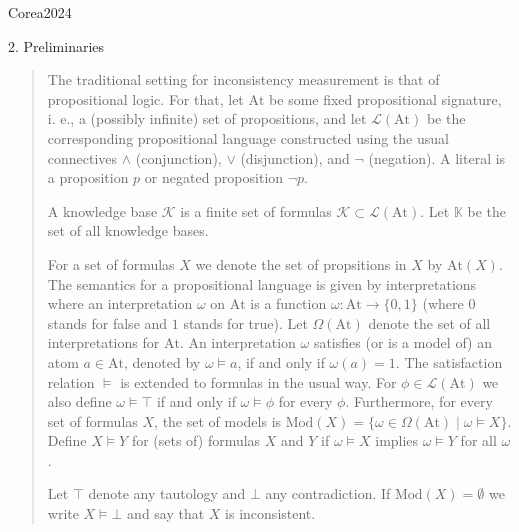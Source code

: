 Corea2024

2. Preliminaries

\begin{quotation}
    The traditional setting for inconsistency measurement is that of propositional logic. For that, let $\text{At}$ be some fixed propositional signature, i. e., a (possibly infinite) set of propositions, and let $\mathcal{L}(\text{At})$ be the corresponding propositional language constructed using the usual connectives $\land$ (conjunction), $\lor$ (disjunction), and $\neg$ (negation). A literal is a proposition $p$ or negated proposition $\neg p$.

    \begin{defn}
        A knowledge base $\mathcal{K}$ is a finite set of formulas $\mathcal{K} \subset \mathcal{L}(\text{At})$. Let $\mathbb{K}$ be the set of all knowledge bases.
    \end{defn}

    For a set of formulas $X$ we denote the set of propsitions in $X$ by $\text{At}(X)$. The semantics for a propositional language is given by interpretations where an interpretation $\omega$ on $\text{At}$ is a function $\omega : \text{At} \rightarrow \{0, 1\}$ (where $0$ stands for false and $1$ stands for true). Let $\Omega(\text{At})$ denote the set of all interpretations for $\text{At}$. An interpretation $\omega$ satisfies (or is a model of) an atom $a \in \text{At}$, denoted by $\omega \models a$, if and only if $\omega(a) = 1$. The satisfaction relation $\models$ is extended to formulas in the usual way. For $\phi \in \mathcal{L}(\text{At})$ we also define $\omega \models \top$ if and only if $\omega \models \phi$ for every $\phi$. Furthermore, for every set of formulas $X$, the set of models is $\text{Mod}(X) = \{\omega \in \Omega(\text{At}) \mid \omega \models X\}$. Define $X \models Y$ for (sets of) formulas $X$ and $Y$ if $\omega \models X$ implies $\omega \models Y$ for all $\omega$.

    Let $\top$ denote any tautology and $\bot$ any contradiction. If $\text{Mod}(X) = \emptyset$ we write $X \models \bot$ and say that $X$ is inconsistent.
\end{quotation}

